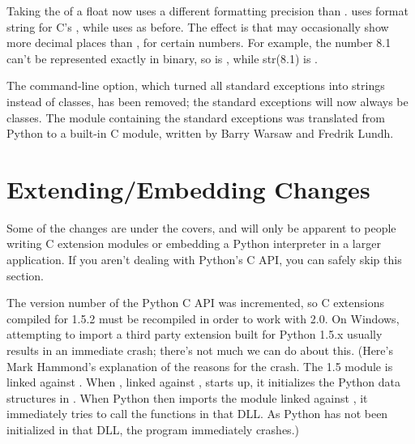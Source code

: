\documentclass{howto}
\begin{document}
Taking the  of a float now uses a different
formatting precision than .   uses
 format string for C's , while
 uses  as before.  The effect is that 
 may occasionally show more decimal places than 
, for certain numbers. 
For example, the number 8.1 can't be represented exactly in binary, so
 is , while str(8.1) is
.

The  command-line option, which turned all standard
exceptions into strings instead of classes, has been removed; the
standard exceptions will now always be classes.  The
 module containing the standard exceptions was
translated from Python to a built-in C module, written by Barry Warsaw
and Fredrik Lundh.


\section{Extending/Embedding Changes}

Some of the changes are under the covers, and will only be apparent to
people writing C extension modules or embedding a Python interpreter
in a larger application.  If you aren't dealing with Python's C API,
you can safely skip this section.

The version number of the Python C API was incremented, so C
extensions compiled for 1.5.2 must be recompiled in order to work with
2.0.  On Windows, attempting to import a third party extension built
for Python 1.5.x usually results in an immediate crash; there's not
much we can do about this.  (Here's Mark Hammond's explanation of the
reasons for the crash.  The 1.5 module is linked against
.  When  , linked against
, starts up, it initializes the Python data
structures in .  When Python then imports the
module  linked against , it
immediately tries to call the functions in that DLL.  As Python has
not been initialized in that DLL, the program immediately crashes.)
\end{document}
